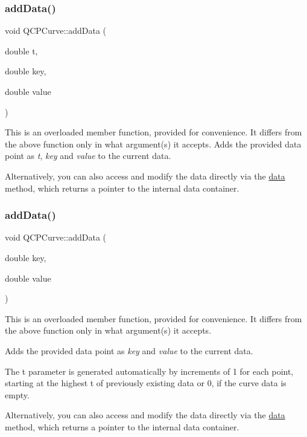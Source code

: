 \subsubsection{\texorpdfstring{addData()}{addData()}\hspace{0.1cm}{\footnotesize\ttfamily [3/4]}}
{\footnotesize\ttfamily void Q\+C\+P\+Curve\+::add\+Data (\begin{DoxyParamCaption}\item[{double}]{t,  }\item[{double}]{key,  }\item[{double}]{value }\end{DoxyParamCaption})}

This is an overloaded member function, provided for convenience. It differs from the above function only in what argument(s) it accepts. Adds the provided data point as {\itshape t}, {\itshape key} and {\itshape value} to the current data.

Alternatively, you can also access and modify the data directly via the \mbox{\hyperlink{class_q_c_p_curve_a761492fd00b1ab7cb18ce23c118c6c60}{data}} method, which returns a pointer to the internal data container. \mbox{\label{class_q_c_p_curve_ada4762e793cd5707b33f35b8a4b0f8fb}} 
\subsubsection{\texorpdfstring{addData()}{addData()}\hspace{0.1cm}{\footnotesize\ttfamily [4/4]}}
{\footnotesize\ttfamily void Q\+C\+P\+Curve\+::add\+Data (\begin{DoxyParamCaption}\item[{double}]{key,  }\item[{double}]{value }\end{DoxyParamCaption})}

This is an overloaded member function, provided for convenience. It differs from the above function only in what argument(s) it accepts.

Adds the provided data point as {\itshape key} and {\itshape value} to the current data.

The t parameter is generated automatically by increments of 1 for each point, starting at the highest t of previously existing data or 0, if the curve data is empty.

Alternatively, you can also access and modify the data directly via the \mbox{\hyperlink{class_q_c_p_curve_a761492fd00b1ab7cb18ce23c118c6c60}{data}} method, which returns a pointer to the internal data container. \mbox{\label{class_q_c_p_curve_a761492fd00b1ab7cb18ce23c118c6c60}} 
